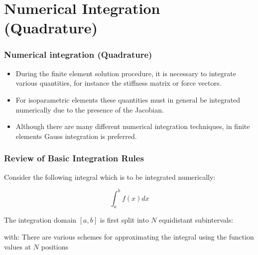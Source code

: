 \documentclass[notes]{beamer}
\begin{document}

\section{Numerical Integration (Quadrature)}
\begin{frame}
\frametitle{Numerical integration (Quadrature)}
\begin{itemize}
	\item During the finite element solution procedure, it is necessary to integrate various quantities,	for instance the stiffness matrix or force vectors. 
	\item For isoparametric elements these
	quantities must in general be integrated numerically due to the presence of the Jacobian.
	\item Although there are many different numerical integration techniques, in finite elements
	Gauss integration is preferred.
\end{itemize}
\end{frame}

\begin{frame}
\frametitle{Review of Basic Integration Rules}
Consider the following integral which is to be integrated numerically:

\begin{equation*}
	\int_a^b f(x)dx
\end{equation*}

The integration domain $[a, b]$ is first split into $N$ equidistant subintervals:

with:
There are various schemes for approximating the integral using the function values at $N$ positions
\end{frame}
\end{document}

